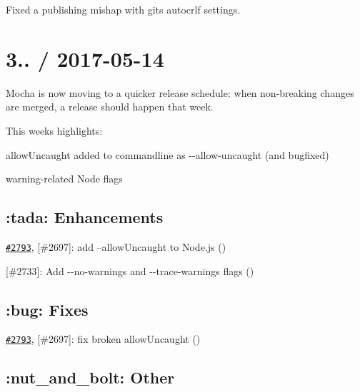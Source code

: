 Fixed a publishing mishap with git\textquotesingle{}s autocrlf settings.

\section*{3.. / 2017-\/05-\/14}

Mocha is now moving to a quicker release schedule\+: when non-\/breaking changes are merged, a release should happen that week.

This week\textquotesingle{}s highlights\+:


\begin{DoxyItemize}
\item {\ttfamily allow\+Uncaught} added to commandline as {\ttfamily -\/-\/allow-\/uncaught} (and bugfixed)
\item warning-\/related Node flags
\end{DoxyItemize}

\subsection*{\+:tada\+: Enhancements}


\begin{DoxyItemize}
\item \href{https://github.com/mochajs/mocha/pull/2793}{\tt \#2793}, \mbox{[}\#2697\mbox{]}\+: add --allow\+Uncaught to Node.\+js (\href{https://github.com/lrowe}{\tt })
\item \mbox{[}\#2733\mbox{]}\+: Add {\ttfamily -\/-\/no-\/warnings} and {\ttfamily -\/-\/trace-\/warnings} flags (\href{https://github.com/sonicdoe}{\tt })
\end{DoxyItemize}

\subsection*{\+:bug\+: Fixes}


\begin{DoxyItemize}
\item \href{https://github.com/mochajs/mocha/pull/2793}{\tt \#2793}, \mbox{[}\#2697\mbox{]}\+: fix broken allow\+Uncaught (\href{https://github.com/lrowe}{\tt })
\end{DoxyItemize}

\subsection*{\+:nut\+\_\+and\+\_\+bolt\+: Other}



